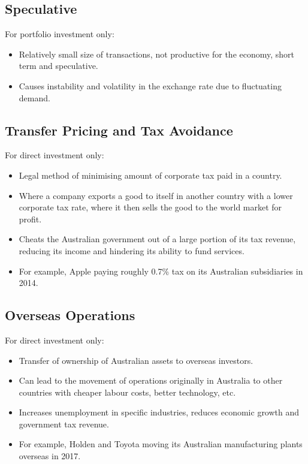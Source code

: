\documentclass[a4paper,11pt]{article}
\begin{document}
\subsection{Speculative}

For portfolio investment only:

\begin{itemize}
\item Relatively small size of transactions, not productive for the economy,
	short term and speculative.
\item Causes instability and volatility in the exchange rate due to fluctuating
	demand.
\end{itemize}


\subsection{Transfer Pricing and Tax Avoidance}

For direct investment only:

\begin{itemize}
\item Legal method of minimising amount of corporate tax paid in a country.
\item Where a company exports a good to itself in another country with a lower
	corporate tax rate, where it then sells the good to the world market for
	profit.
\item Cheats the Australian government out of a large portion of its tax
	revenue, reducing its income and hindering its ability to fund services.
\item For example, Apple paying roughly 0.7\% tax on its Australian
	subsidiaries in 2014.
\end{itemize}


\subsection{Overseas Operations}

For direct investment only:

\begin{itemize}
\item Transfer of ownership of Australian assets to overseas investors.
\item Can lead to the movement of operations originally in Australia to other
	countries with cheaper labour costs, better technology, etc.
\item Increases unemployment in specific industries, reduces economic growth
	and government tax revenue.
\item For example, Holden and Toyota moving its Australian manufacturing
	plants overseas in 2017.
\end{itemize}
\end{document}
